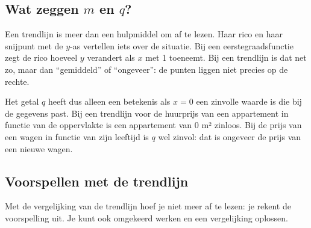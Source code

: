 \begin{oefeningen}
\end{oefeningen}

\subsection{Wat zeggen $m$ en $q$?}

Een trendlijn is meer dan een hulpmiddel om af te lezen. Haar rico en haar snijpunt met de $y$-as vertellen iets over de situatie. Bij een eerstegraadsfunctie zegt de rico hoeveel $y$ verandert als $x$ met 1 toeneemt. Bij een trendlijn is dat net zo, maar dan ``gemiddeld'' of ``ongeveer'': de punten liggen niet precies op de rechte.


Het getal $q$ heeft dus alleen een betekenis als $x = 0$ een zinvolle waarde is die bij de gegevens past. Bij een trendlijn voor de huurprijs van een appartement in functie van de oppervlakte is een appartement van 0 m² zinloos. Bij de prijs van een wagen in functie van zijn leeftijd is $q$ wel zinvol: dat is ongeveer de prijs van een nieuwe wagen.

\begin{oefeningen}
\end{oefeningen}

\subsection{Voorspellen met de trendlijn}

Met de vergelijking van de trendlijn hoef je niet meer af te lezen: je rekent de voorspelling uit. Je kunt ook omgekeerd werken en een vergelijking oplossen.

